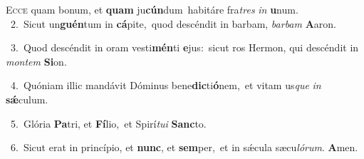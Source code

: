 \lettrine{\initial\textcolor{\initialcolor}{E}}{cce} quam bonum, et \textbf{quam} ju\-\textbf{cún}\-dum~\star habitáre fra\textit{tres} \textit{in} \textbf{u}\-num.\\
{\numbfont\textcolor{\numbcolor}{~2.}}~Sicut un\-\textbf{guén}\-tum in \textbf{cá}\-pite,~\star quod descéndit in barbam, \textit{bar}\-\textit{bam} \textbf{A}\-aron.\par
{\numbfont\textcolor{\numbcolor}{~3.}}~Quod descéndit in oram vesti\-\textbf{mén}\-ti \textbf{e}\-jus:~\star sicut ros Hermon, qui descéndit in \textit{mon}\-\textit{tem} \textbf{Si}\-on.\par
{\numbfont\textcolor{\numbcolor}{~4.}}~Quóniam illic mandávit Dóminus bene\-\textbf{dic}\-ti\-\textbf{ó}\-nem,~\star et vitam us\textit{que} \textit{in} \textbf{sǽ}\-culum.\par
{\numbfont\textcolor{\numbcolor}{~5.}}~Glória \textbf{Pa}\-tri, et \textbf{Fí}\-lio,~\star et Spirí\-\textit{tu}\-\textit{i} \textbf{Sanc}\-to.\par
{\numbfont\textcolor{\numbcolor}{~6.}}~Sicut erat in princípio, et \textbf{nunc}\-, et \textbf{sem}\-per,~\star et in sǽcula sæcu\-\textit{ló}\-\textit{rum}. \textbf{A}\-men.\par
